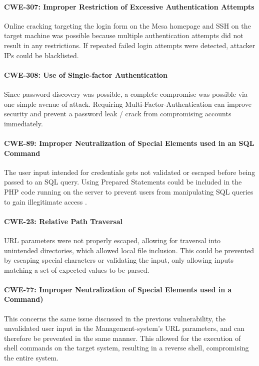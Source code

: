 \documentclass[../report.tex]{subfiles}
\begin{document}
\paragraph{CWE-307: Improper Restriction of Excessive Authentication Attempts}
 Online cracking targeting the login form on the Mesa homepage and SSH on the target machine was possible because multiple authentication attempts did not result in any restrictions. If repeated failed login attempts were detected, attacker IPs could be blacklisted.

\paragraph{CWE-308: Use of Single-factor Authentication}
Since password discovery was possible, a complete compromise was possible via one simple avenue of attack. Requiring Multi-Factor-Authentication can improve security and prevent a password leak / crack from compromising accounts immediately.

\paragraph{CWE-89: Improper Neutralization of Special Elements used in an SQL Command}
The user input intended for credentials gets not validated or escaped before being passed to an SQL query. Using Prepared Statements could be included in the PHP code running on the server to prevent users from manipulating SQL queries to gain illegitimate access \autocite{php:prep}.

\paragraph{CWE-23: Relative Path Traversal}
URL parameters were not properly escaped, allowing for traversal into unintended directories, which allowed local file inclusion. This could be prevented by escaping special characters or validating the input, only allowing inputs matching a set of expected values to be parsed.

\paragraph{CWE-77: Improper Neutralization of Special Elements used in a Command)}
This concerns the same issue discussed in the previous vulnerability, the unvalidated user input in the Management-system's URL parameters, and can therefore be prevented in the same manner. This allowed for the execution of shell commands on the target system, resulting in a reverse shell, compromising the entire system.
\end{document}
